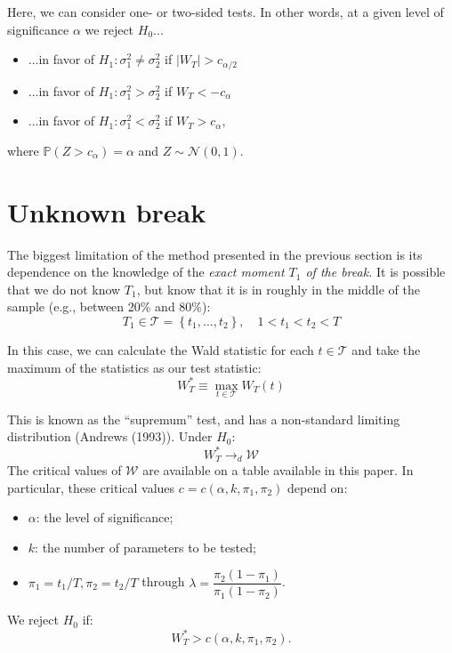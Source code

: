 \documentclass[11pt, a4paper]{report}
\theoremstyle{plain}
\theoremstyle{plain}
\theoremstyle{remark}
\begin{document}
Here, we can consider one- or two-sided tests. In other words, at a given level of significance $\alpha$ we reject $H_{0}...$ \begin{itemize}
\item ...in favor of $H_{1}: \sigma_{1}^{2} \neq \sigma_{2}^{2}$ if $\left|W_{T}\right|>c_{\alpha / 2}$

\item ...in favor of $H_{1}: \sigma_{1}^{2}>\sigma_{2}^{2}$ if $W_{T}<-c_{\alpha}$

\item ...in favor of $H_{1}: \sigma_{1}^{2}<\sigma_{2}^{2}$ if $W_{T}>c_{\alpha},$
\end{itemize}
where $\mathbb{P}\left(Z>c_{\alpha}\right)=\alpha$ and $Z \sim \mathcal{N}(0,1).$

\section{Unknown break}

The biggest limitation of the method presented in the previous section is its dependence on the knowledge of the \textit{exact moment $T_1$ of the break.} It is possible that we do not know $T_1$, but know that it is in roughly in the middle of the sample (e.g., between 20\% and 80\%):
 $$
T_{1} \in \mathcal{T}=\left\{t_{1}, \ldots, t_{2}\right\}, \quad 1<t_{1}<t_{2}<T
$$

In this case, we can calculate the Wald statistic for each $t \in \mathcal{T}$ and take the maximum of the statistics as our test statistic:
$$
W_{T}^{*} \equiv \max _{t \in \mathcal{T}} W_{T}(t)
$$

This is known as the ``supremum'' test, and has a non-standard limiting distribution (Andrews (1993)). Under $H_0:$
$$W_T^* \to_d \mathcal{W}$$
The critical values of $\mathcal{W}$ are available on a table available in this paper. In particular, these critical values $c = c(\alpha, k, \pi_1, \pi_2)$ depend on:
\begin{itemize}
\item $\alpha$: the level of significance;
\item $k$: the number of parameters to be tested;
\item $\pi_1 = t_1/T, \pi_2 = t_2/T$ through $\lambda = \dfrac{\pi_2(1-\pi_1)}{\pi_1(1-\pi_2)}$.
\end{itemize}

We reject $H_0$ if:
$$W_{T}^{*}>c\left(\alpha, k, \pi_{1}, \pi_{2}\right).$$
\end{document}
